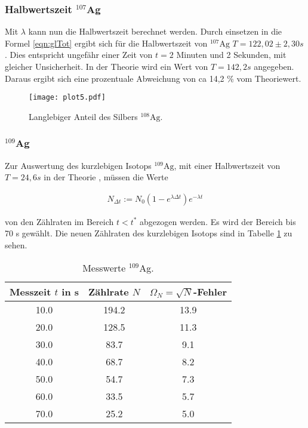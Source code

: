 \subsubsection{Halbwertszeit $^{107}$Ag}

Mit $\lambda$ kann nun die Halbwertszeit berechnet werden.
Durch einsetzen in die Formel \ref{eqn:glTot} ergibt sich für die Halbwertszeit von $^{107}\text{Ag}$ $T = 122,02 \pm 2,30 s$.
Dies entspricht ungefähr einer Zeit von $t = 2$ Minuten und 2 Sekunden, mit gleicher Unsicherheit.
In der Theorie wird ein Wert von $T = 142,2 s$ \cite{Periode} angegeben.
Daraus ergibt sich eine prozentuale Abweichung von ca 14,2 \% vom Theoriewert.

\begin{figure}
  \centering
  \texttt{[image: plot5.pdf]}
  \caption{Langlebiger Anteil des Silbers $^{108}\text{Ag}$.}
  \label{fig:plot3}
\end{figure}
\FloatBarrier

\subsubsection{$^{109}$Ag}

Zur Auswertung des kurzlebigen Isotops $^{109}\text{Ag}$, mit einer Halbwertszeit von $T = 24,6 s$ in der Theorie \cite{Periode}, müssen die Werte 

\begin{align*}
  N_{\Delta t} := N_0(1-e^{\lambda \Delta t})e^{-\lambda t}
\end{align*}

von den Zählraten im Bereich $t < t^*$ abgezogen werden.
Es wird der Bereich bis 70 s gewählt.
Die neuen Zählraten des kurzlebigen Isotops sind in Tabelle \ref{tab:Nk} zu sehen. 

\begin{table}
  \centering
  \caption{Messwerte $^{109}$Ag.}
  \label{tab:Nk}
\begin{tabular}{c c c}
  \toprule
  Messzeit $t$ in s & Zählrate $N$ & $\Omega_N = \sqrt{N}$-Fehler\\
  \midrule
  10.0 & 194.2 & 13.9\\
  20.0 & 128.5 & 11.3 \\
  30.0 & 83.7 & 9.1 \\
  40.0 & 68.7 & 8.2 \\
  50.0 & 54.7 & 7.3 \\
  60.0 & 33.5 & 5.7 \\
  70.0 & 25.2 & 5.0 \\
  \bottomrule
\end{tabular}
\end{table}
\FloatBarrier

